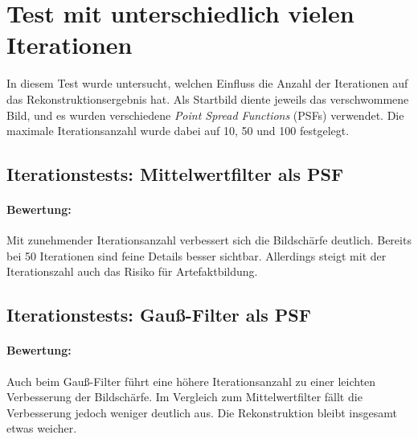 \section{Test mit unterschiedlich vielen Iterationen}

In diesem Test wurde untersucht, welchen Einfluss die Anzahl der Iterationen auf das Rekonstruktionsergebnis hat. Als Startbild diente jeweils das verschwommene Bild, und es wurden verschiedene \textit{Point Spread Functions} (PSFs) verwendet. Die maximale Iterationsanzahl wurde dabei auf 10, 50 und 100 festgelegt.

\subsection{Iterationstests: Mittelwertfilter als PSF}

\paragraph{Bewertung:}
Mit zunehmender Iterationsanzahl verbessert sich die Bildschärfe deutlich. Bereits bei 50 Iterationen sind feine Details besser sichtbar. Allerdings steigt mit der Iterationszahl auch das Risiko für Artefaktbildung.

\noindent
\begin{minipage}[t]{0.33\textwidth}
\end{minipage}
%
\begin{minipage}[t]{0.33\textwidth}
\end{minipage}
%
\begin{minipage}[t]{0.33\textwidth}
\end{minipage}




\subsection{Iterationstests: Gauß-Filter als PSF}

\paragraph{Bewertung:}
Auch beim Gauß-Filter führt eine höhere Iterationsanzahl zu einer leichten Verbesserung der Bildschärfe. Im Vergleich zum Mittelwertfilter fällt die Verbesserung jedoch weniger deutlich aus. Die Rekonstruktion bleibt insgesamt etwas weicher.

